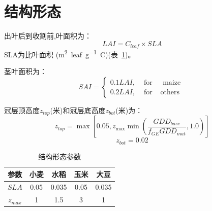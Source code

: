 \section{结构形态}
出叶后到收割前,叶面积为：
\begin{equation}
LAI=C_{leaf} \times SLA
\end{equation}
SLA为比叶面积 (\unit{m^2.leaf.g^{-1}.C})(表~\ref{tab:结构形态参数})。

茎叶面积为：
\begin{equation}
SAI=\left\{\begin{array}{lcc}0.1 LAI, & \text { for } & \text { maize } \\
   0.2 LAI, & \text { for } & \text {others}\end{array}\right.
\end{equation}

冠层顶高度$z_{top}$(米)和冠层底高度$z_{bot}$(米)为：
\begin{equation}
z_{top}=\max \left[0.05, z_{\max} \min \left(\frac{GDD_{base}}{f_{GE} G D D_{mat}}, 1.0\right)\right]
\end{equation}
\begin{equation}
z_{b o t}=0.02
\end{equation}

\begin{table}[htbp]
  \centering
  \caption{结构形态参数}
  \label{tab:结构形态参数}
  \begin{tabular}{@{}ccccc@{}}
  \toprule
  参数   & 小麦   & 水稻    & 玉米   & 大豆    \\ \midrule
  $SLA$  & 0.05 & 0.035 & 0.05 & 0.035 \\
  $z_{max}$ & 1    & 1.5   & 3    & 1     \\ \bottomrule
  \end{tabular}
\end{table}
